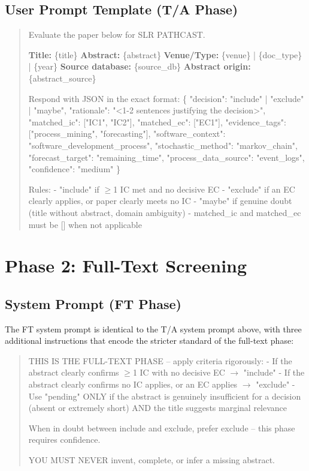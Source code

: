 \subsection*{User Prompt Template (T/A Phase)}

\begin{quote}
\small\ttfamily
Evaluate the paper below for SLR PATHCAST.

\textbf{Title:} \{title\}
\textbf{Abstract:} \{abstract\}
\textbf{Venue/Type:} \{venue\} | \{doc\_type\} | \{year\}
\textbf{Source database:} \{source\_db\}
\textbf{Abstract origin:} \{abstract\_source\}

Respond with JSON in the exact format:
\{
  "decision": "include" | "exclude" | "maybe",
  "rationale": "<1-2 sentences justifying the decision>",
  "matched\_ic": ["IC1", "IC2"],
  "matched\_ec": ["EC1"],
  "evidence\_tags": ["process\_mining", "forecasting"],
  "software\_context": "software\_development\_process",
  "stochastic\_method": "markov\_chain",
  "forecast\_target": "remaining\_time",
  "process\_data\_source": "event\_logs",
  "confidence": "medium"
\}

Rules:
- "include" if $\geq$1 IC met and no decisive EC
- "exclude" if an EC clearly applies, or paper clearly meets no IC
- "maybe" if genuine doubt (title without abstract, domain ambiguity)
- matched\_ic and matched\_ec must be [] when not applicable
\end{quote}

\section{Phase 2: Full-Text Screening}
\label{app:slr-ft-prompt}

\subsection*{System Prompt (FT Phase)}

The FT system prompt is identical to the T/A system prompt above, with
three additional instructions that encode the stricter standard of the
full-text phase:

\begin{quote}
\small\ttfamily
THIS IS THE FULL-TEXT PHASE -- apply criteria rigorously:
- If the abstract clearly confirms $\geq$1 IC with no decisive EC
  $\rightarrow$ "include"
- If the abstract clearly confirms no IC applies, or an EC applies
  $\rightarrow$ "exclude"
- Use "pending" ONLY if the abstract is genuinely insufficient for
  a decision (absent or extremely short) AND the title suggests
  marginal relevance

When in doubt between include and exclude, prefer exclude -- this
phase requires confidence.

YOU MUST NEVER invent, complete, or infer a missing abstract.
\end{quote}

